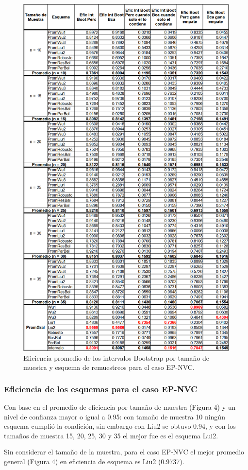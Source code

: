 \begin{figure}[H] 
	\centering 
	\includegraphics[width=0.55\linewidth]{img/EP_NVC_Efic_Boots.png} 
	\caption{Eficiencia promedio de los intervalos Bootstrap por tamaño de muestra y esquema de remuestreos para el caso EP-NVC.} 
	\label{fig:EP_NVC_Boots}
\end{figure}

\FloatBarrier

\subsubsection{Eficiencia de los esquemas para el caso EP-NVC}
Con base en el promedio de eficiencia por tamaño de muestra (Figura 4) y un nivel de confianza mayor o igual a 0.95: con tamaño de muestra 10 ningún esquema cumplió la condición, sin embargo con Liu2 se obtuvo 0.94, y con los tamaños de muestra 15, 20, 25, 30 y 35 el mejor fue es el esquema Lui2.
\vspace{.5cm}

Sin considerar el tamaño de la muestra, para el caso EP-NVC el mejor promedio general (Figura 4) en eficiencia de esquema es Liu2 (0.9737).


